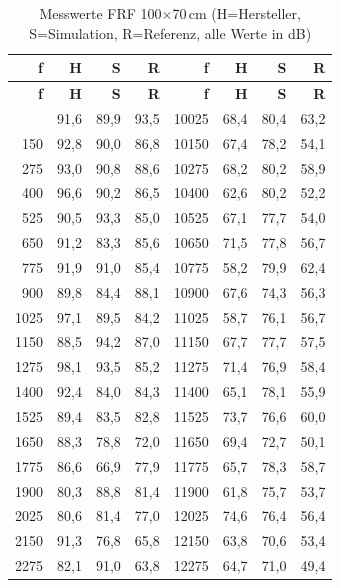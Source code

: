 \begin{small}
\setlength{\tabcolsep}{2pt}
\renewcommand{\arraystretch}{1.0}
\begin{longtable}{|r|r|r|r|r|r|r|r|}
\caption{Messwerte FRF 100$\times$70\,cm (H=Hersteller, S=Simulation, R=Referenz, alle Werte in dB)} \\
\hline
\textbf{f} & \textbf{H} & \textbf{S} & \textbf{R} & \textbf{f} & \textbf{H} & \textbf{S} & \textbf{R} \\
\hline
\endfirsthead
\hline
\textbf{f} & \textbf{H} & \textbf{S} & \textbf{R} & \textbf{f} & \textbf{H} & \textbf{S} & \textbf{R} \\
\hline
\endhead
\hline
\endfoot
\hline
\endlastfoot
25 & 91,6 & 89,9 & 93,5 & 10025 & 68,4 & 80,4 & 63,2 \\ \hline
150 & 92,8 & 90,0 & 86,8 & 10150 & 67,4 & 78,2 & 54,1 \\ \hline
275 & 93,0 & 90,8 & 88,6 & 10275 & 68,2 & 80,2 & 58,9 \\ \hline
400 & 96,6 & 90,2 & 86,5 & 10400 & 62,6 & 80,2 & 52,2 \\ \hline
525 & 90,5 & 93,3 & 85,0 & 10525 & 67,1 & 77,7 & 54,0 \\ \hline
650 & 91,2 & 83,3 & 85,6 & 10650 & 71,5 & 77,8 & 56,7 \\ \hline
775 & 91,9 & 91,0 & 85,4 & 10775 & 58,2 & 79,9 & 62,4 \\ \hline
900 & 89,8 & 84,4 & 88,1 & 10900 & 67,6 & 74,3 & 56,3 \\ \hline
1025 & 97,1 & 89,5 & 84,2 & 11025 & 58,7 & 76,1 & 56,7 \\ \hline
1150 & 88,5 & 94,2 & 87,0 & 11150 & 67,7 & 77,7 & 57,5 \\ \hline
1275 & 98,1 & 93,5 & 85,2 & 11275 & 71,4 & 76,9 & 58,4 \\ \hline
1400 & 92,4 & 84,0 & 84,3 & 11400 & 65,1 & 78,1 & 55,9 \\ \hline
1525 & 89,4 & 83,5 & 82,8 & 11525 & 73,7 & 76,6 & 60,0 \\ \hline
1650 & 88,3 & 78,8 & 72,0 & 11650 & 69,4 & 72,7 & 50,1 \\ \hline
1775 & 86,6 & 66,9 & 77,9 & 11775 & 65,7 & 78,3 & 58,7 \\ \hline
1900 & 80,3 & 88,8 & 81,4 & 11900 & 61,8 & 75,7 & 53,7 \\ \hline
2025 & 80,6 & 81,4 & 77,0 & 12025 & 74,6 & 76,4 & 56,4 \\ \hline
2150 & 91,3 & 76,8 & 65,8 & 12150 & 63,8 & 70,6 & 53,4 \\ \hline
2275 & 82,1 & 91,0 & 63,8 & 12275 & 64,7 & 71,0 & 49,4 \\ \hline

\end{longtable}
\end{small}
